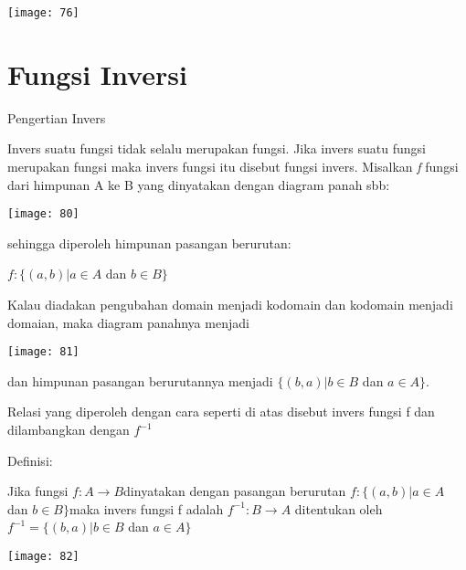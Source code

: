 \documentclass[11pt,fleqn]{book} %
\begin{document}
\begin{myEnumerate}
\begin{itemize}
\begin{center}
\noindent \texttt{[image: 76]}\textbf{}
\end{center}

\noindent

\section{Fungsi Inversi}

\noindent Pengertian Invers

  Invers suatu fungsi tidak selalu merupakan fungsi. Jika invers suatu fungsi merupakan fungsi maka invers fungsi itu disebut fungsi invers. Misalkan \textit{f} fungsi dari himpunan A ke B yang dinyatakan dengan diagram panah sbb:

\noindent 

\begin{center}
\noindent \texttt{[image: 80]}
\end{center}

\noindent sehingga diperoleh himpunan pasangan berurutan:

\noindent $f:\{ (a,b)|a\in A$ dan $b\in B\} $

\noindent 

Kalau diadakan pengubahan domain menjadi kodomain dan kodomain menjadi domaian, maka diagram panahnya menjadi

\begin{center}
\noindent \texttt{[image: 81]}
\end{center}

dan himpunan pasangan berurutannya menjadi $\{ (b,a)|b\in B$ dan $a\in A\} $.

\noindent Relasi yang diperoleh dengan cara seperti di atas disebut invers fungsi f dan dilambangkan dengan $f^{-1} $

\noindent 

\noindent Definisi:

\noindent Jika fungsi $f:A\to B$dinyatakan dengan pasangan berurutan $f:\{ (a,b)|a\in A$ dan $b\in B\} $maka invers fungsi f adalah $f^{-1} :B\to A$ ditentukan oleh $f^{-1} =\{ (b,a)|b\in B$ dan $a\in A\} $

\noindent 

\begin{center}
\noindent \texttt{[image: 82]}
\end{center}


\end{itemize}
\end{myEnumerate}
\end{document}
